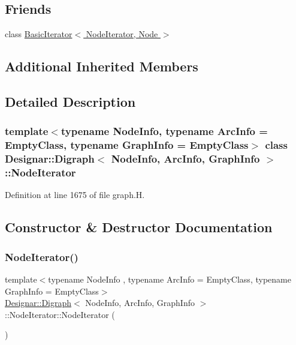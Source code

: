 \subsection*{Friends}
\begin{DoxyCompactItemize}
\item 
class \hyperlink{class_designar_1_1_digraph_1_1_node_iterator_a21dc6ae614d097ff896e9e8e422d8f3c}{Basic\+Iterator$<$ Node\+Iterator, Node $>$}
\end{DoxyCompactItemize}
\subsection*{Additional Inherited Members}


\subsection{Detailed Description}
\subsubsection*{template$<$typename Node\+Info, typename Arc\+Info = Empty\+Class, typename Graph\+Info = Empty\+Class$>$\newline
class Designar\+::\+Digraph$<$ Node\+Info, Arc\+Info, Graph\+Info $>$\+::\+Node\+Iterator}



Definition at line 1675 of file graph.\+H.



\subsection{Constructor \& Destructor Documentation}
\mbox{\label{class_designar_1_1_digraph_1_1_node_iterator_a53d6530188cf6c4ed6d2b2b114af9967}} 
\subsubsection{\texorpdfstring{Node\+Iterator()}{NodeIterator()}\hspace{0.1cm}{\footnotesize\ttfamily [1/5]}}
{\footnotesize\ttfamily template$<$typename Node\+Info , typename Arc\+Info  = Empty\+Class, typename Graph\+Info  = Empty\+Class$>$ \\
\hyperlink{class_designar_1_1_digraph}{Designar\+::\+Digraph}$<$ Node\+Info, Arc\+Info, Graph\+Info $>$\+::Node\+Iterator\+::\+Node\+Iterator (\begin{DoxyParamCaption}{ }\end{DoxyParamCaption})\hspace{0.3cm}{\ttfamily [inline]}}



